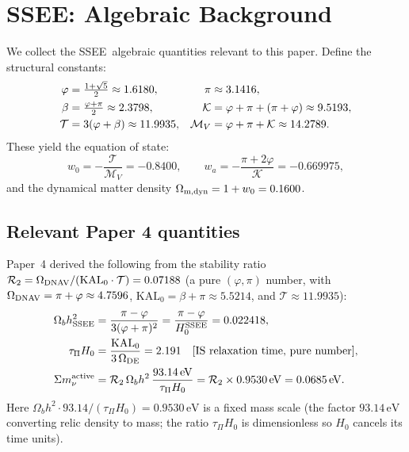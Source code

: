 \documentclass[12pt,a4paper]{article}
\newcommand{\SSEE}{\textsc{SSEE}}
\newcommand{\mnu}{\Sigma m_\nu}
\begin{document}
\section{SSEE: Algebraic Background}
\label{sec:background}

We collect the \SSEE\ algebraic quantities relevant to this paper. Define the
structural constants:
\begin{align}
  \varphi &= \tfrac{1+\sqrt{5}}{2} \approx 1.6180, &
  \pi &\approx 3.1416, \notag\\
  \beta &= \tfrac{\varphi+\pi}{2} \approx 2.3798, &
  \mathcal{K} &= \varphi + \pi + (\pi+\varphi) \approx 9.5193, \notag\\
  \mathcal{T} &= 3(\varphi+\beta) \approx 11.9935, &
  \mathcal{M}_V &= \varphi + \pi + \mathcal{K} \approx 14.2789.
\end{align}
These yield the equation of state:
\begin{equation}
  w_0 = -\frac{\mathcal{T}}{\mathcal{M}_V} = -0.8400, \qquad
  w_a = -\frac{\pi + 2\varphi}{\mathcal{K}} = -0.669975,
\end{equation}
and the dynamical matter density $\Omega_{\rm m,dyn} = 1 + w_0 = 0.1600$.

\subsection{Relevant Paper 4 quantities}
\label{subsec:paper4}

Paper~4 derived the following from the stability ratio
$\mathcal{R}_2 = \Omega_{\rm DNAV}/(\mathrm{KAL}_0\cdot\mathcal{T}) = 0.07188$
(a pure $(\varphi,\pi)$ number, with $\Omega_{\rm DNAV} = \pi+\varphi \approx 4.7596$,
$\mathrm{KAL}_0 = \beta + \pi \approx 5.5214$, and $\mathcal{T} \approx 11.9935$):
\begin{align}
  \Omega_b h^2_{\rm SSEE} &= \frac{\pi-\varphi}{3(\varphi+\pi)^2}
    = \frac{\pi-\varphi}{H_0^{\rm SSEE}} = 0.022418, \\
  \tau_\Pi H_0 &= \frac{\mathrm{KAL}_0}{3\,\Omega_{\rm DE}} = 2.191 \quad
    [\text{IS relaxation time, pure number}], \\
  \mnu^{\rm active} &= \mathcal{R}_2\,\Omega_b h^2\,\frac{93.14\,\mathrm{eV}}{\tau_\Pi H_0}
    = \mathcal{R}_2 \times 0.9530\,\mathrm{eV} = 0.0685\,\mathrm{eV}.
\end{align}
Here $\Omega_b h^2 \cdot 93.14/(\tau_\Pi H_0) = 0.9530\,\mathrm{eV}$ is a fixed
mass scale (the factor $93.14\,\mathrm{eV}$ converting relic density to mass; the
ratio $\tau_\Pi H_0$ is dimensionless so $H_0$ cancels its time units).
\end{document}
